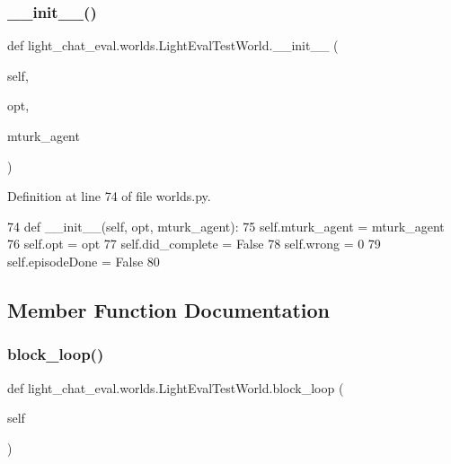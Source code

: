 \subsubsection{\texorpdfstring{\+\_\+\+\_\+init\+\_\+\+\_\+()}{\_\_init\_\_()}}
{\footnotesize\ttfamily def light\+\_\+chat\+\_\+eval.\+worlds.\+Light\+Eval\+Test\+World.\+\_\+\+\_\+init\+\_\+\+\_\+ (\begin{DoxyParamCaption}\item[{}]{self,  }\item[{}]{opt,  }\item[{}]{mturk\+\_\+agent }\end{DoxyParamCaption})}



Definition at line 74 of file worlds.\+py.


\begin{DoxyCode}
74     \textcolor{keyword}{def }\_\_init\_\_(self, opt, mturk\_agent):
75         self.mturk\_agent = mturk\_agent
76         self.opt = opt
77         self.did\_complete = \textcolor{keyword}{False}
78         self.wrong = 0
79         self.episodeDone = \textcolor{keyword}{False}
80 
\end{DoxyCode}


\subsection{Member Function Documentation}
\mbox{\label{classlight__chat__eval_1_1worlds_1_1LightEvalTestWorld_a0d61cdfcfa831bf50078d68edf947e05}} 
\subsubsection{\texorpdfstring{block\+\_\+loop()}{block\_loop()}}
{\footnotesize\ttfamily def light\+\_\+chat\+\_\+eval.\+worlds.\+Light\+Eval\+Test\+World.\+block\+\_\+loop (\begin{DoxyParamCaption}\item[{}]{self }\end{DoxyParamCaption})}



